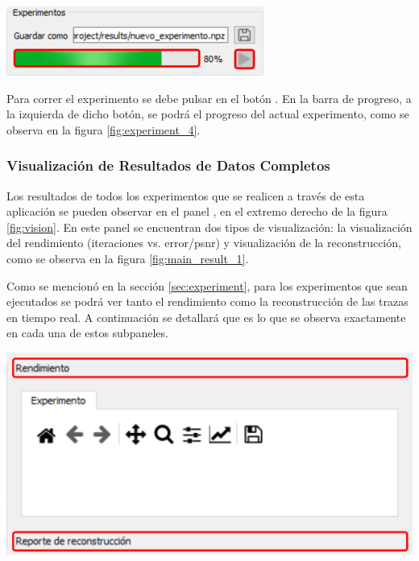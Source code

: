 \documentclass[12pt,twoside,letter]{ol-softwaremanual}
\newcommand*\circled[1]{\tikz[baseline=(char.base)]{
            \node[shape=circle,draw,inner sep=2pt] (char) {#1};}}
\newenvironment{Figure}
  {\par\medskip\noindent\minipage{\linewidth}}
  {\endminipage\par\medskip}
\begin{document}
\begin{multicols}{2}

\begin{Figure}
	\centering
	\includegraphics[width=0.7\linewidth]{experiment-4.png}
	\label{fig:experiment_4}
\end{Figure}

Para correr el experimento se debe pulsar en el botón \hspace{0.5mm} \faPlay \hspace{0.5mm}. En la barra de progreso, a la izquierda de dicho botón, se podrá el progreso del actual experimento, como se observa en la figura \ref{fig:experiment_4}.

\end{multicols}

\subsubsection{Visualización de Resultados de Datos Completos}

Los resultados de todos los experimentos que se realicen a través de esta aplicación se pueden observar en el panel \circled{7}, en el extremo derecho de la figura \ref{fig:vision}. En este panel se encuentran dos tipos de visualización: la visualización del rendimiento (iteraciones vs. error/psnr) y visualización de la reconstrucción, como se observa en la figura \ref{fig:main_result_1}.

\begin{multicols}{2}

Como se mencionó en la sección \ref{sec:experiment}, para los experimentos que sean ejecutados se podrá ver tanto el rendimiento como la reconstrucción de las trazas en tiempo real. A continuación se detallará que es lo que se observa exactamente en cada una de estos subpaneles.

\begin{Figure}
    \centering
    \includegraphics[width=0.7\linewidth]{main-result-1.png}
    \label{fig:main_result_1}
\end{Figure}

\end{multicols}
\end{document}
